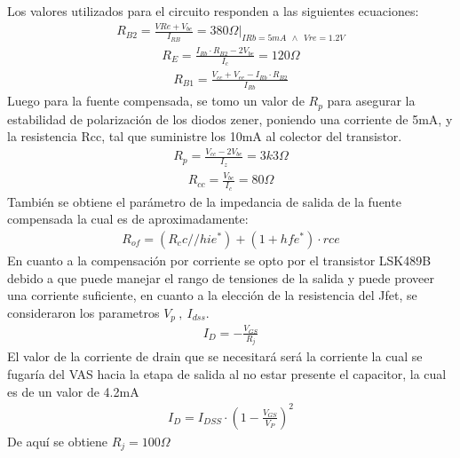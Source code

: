 Los valores utilizados para el circuito responden a las siguientes ecuaciones:
\begin{align}
R_{B2}= \frac{V{Re}+V_{be}}{I_{RB}} = 380 \Omega |_{IRb=5mA \  \ \wedge \ \  Vre=1.2V}
\end{align}
\begin{align}
R_E=\frac{I_{Rb}\cdot R_{B2}-2V_{be}}{I_c}=120\Omega
\end{align}
\begin{align}
R_{B1}= \frac{V_{cc}+V_{ee}-I_{Rb}\cdot R_{B2}}{I_{Rb}}
\end{align}
Luego para la fuente compensada, se tomo un valor de $R_p$ para asegurar la estabilidad de polarización de los diodos zener, poniendo una corriente de 5mA, y la resistencia Rcc, tal que suministre los 10mA al colector del transistor.
\begin{align}
R_p = \frac{V_{cc}-2V_{be}}{I_z}=3k3\Omega
\end{align}
\begin{align}
R_{cc}=\frac{V_{be}}{I_c}=80\Omega
\end{align}
También se obtiene el parámetro de la impedancia de salida de la fuente compensada la cual es de aproximadamente:
\begin{align}
R_{of} = (R_cc // hie^*)+(1+hfe^* )\cdot rce
\end{align}
En cuanto a la compensación por corriente se opto por el transistor LSK489B  debido a que puede manejar el rango de tensiones de la salida y puede proveer una corriente suficiente, en cuanto a la  elección de la resistencia del Jfet, se consideraron los parametros $V_p \ , \ I_{dss}$.
\begin{align}
I_D=-\frac{V_{GS}}{R_j}
\end{align}
El valor de la corriente de drain que se necesitará será la corriente la cual se fugaría del VAS hacia la etapa de salida al no estar presente el capacitor, la cual es de un valor de 4.2mA
\begin{align}
I_D= I_{DSS} \cdot \left(1-\frac{V_{GS}}{V_P} \right)^2
\end{align}
De aquí se obtiene $R_j = 100\Omega$
